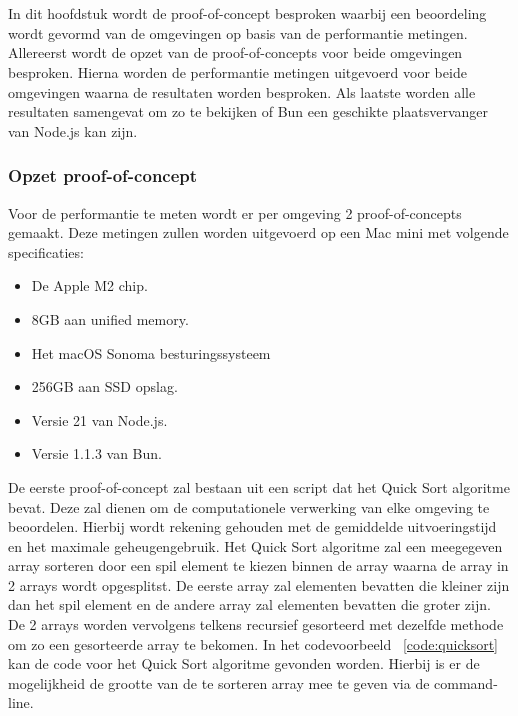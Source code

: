 
\chapter{}%
\label{ch:proof-of-concept}

In dit hoofdstuk wordt de proof-of-concept besproken 
waarbij een beoordeling wordt gevormd van de omgevingen op basis van de performantie metingen.
Allereerst wordt de opzet van de proof-of-concepts voor beide omgevingen besproken.
Hierna worden de performantie metingen uitgevoerd voor beide omgevingen waarna de resultaten worden besproken.
Als laatste worden alle resultaten samengevat om zo te bekijken of Bun een geschikte plaatsvervanger van Node.js kan zijn.

\subsection{Opzet proof-of-concept}
Voor de performantie te meten wordt er per omgeving 2 proof-of-concepts gemaakt. 
Deze metingen zullen worden uitgevoerd op een Mac mini met volgende specificaties:
\begin{itemize}
  \item De Apple M2 chip.
  \item 8GB aan unified memory.
  \item Het macOS Sonoma besturingssysteem
  \item 256GB aan SSD opslag.
  \item Versie 21 van Node.js.
  \item Versie 1.1.3 van Bun.
\end{itemize}
De eerste proof-of-concept zal bestaan uit een script dat het Quick Sort algoritme bevat. 
Deze zal dienen om de computationele verwerking van elke omgeving te beoordelen. Hierbij wordt rekening gehouden met de gemiddelde uitvoeringstijd en het maximale geheugengebruik.
Het Quick Sort algoritme zal een meegegeven array sorteren door een spil element te kiezen binnen de array
waarna de array in 2 arrays wordt opgesplitst. De eerste array zal elementen bevatten die kleiner zijn dan het spil element 
en de andere array zal elementen bevatten die groter zijn. 
De 2 arrays worden vervolgens telkens recursief gesorteerd met dezelfde methode om zo een gesorteerde array te bekomen.
In het codevoorbeeld ~\ref{code:quicksort} kan de code voor het Quick Sort algoritme gevonden worden.
Hierbij is er de mogelijkheid de grootte van de te sorteren array mee te geven via de command-line.

